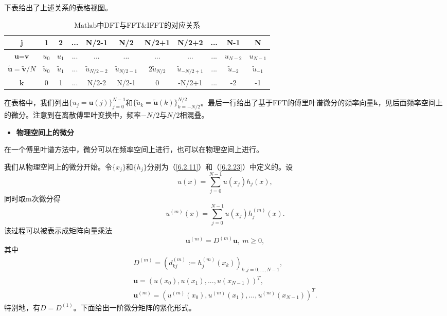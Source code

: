     下表给出了上述关系的表格视图。    
\begin{table}[h]
\centering
\caption{$\mathrm{Matlab}$中DFT与FFT$\&$IFFT的对应关系}
\begin{tabular}{ccccccccccc}
\hline
 j&  1&  2&  ...&  N/2-1&  N/2&  N/2+1&  N/2+2&  ...&  N-1& N \\ \hline
 $\textbf{u} = \textbf{v}$&  $u_0$&  $u_1$&  ...&  ...&  ...&  ...& ...&  ...&  $u_{N-2}$& $u_{N-1}$ \\
 $\widetilde{\textbf{u}} = \widetilde{\textbf{v}}/N$&  $\widetilde{u}_0$&  $\widetilde{u}_1$&  ...&  $\widetilde{u}_{N/2-2}$&  $\widetilde{u}_{N/2-1}$&  $2\widetilde{u}_{N/2}$&  $\widetilde{u}_{-N/2+1}$&  ...&  $\widetilde{u}_{-2}$& $\widetilde{u}_{-1}$ \\
 $\textbf{k}$&  0&  1&  ...&  N/2-2&  N/2-1&  0&  -N/2+1&  ...&  -2& -1 \\ \hline
\end{tabular}
\label{表6.2.1}
\end{table}    
    在表格中，我们列出$\{ u_j = \textbf{u}(j) \}_{j = 0}^{N-1}$和$\{ \widetilde{u}_k = \widetilde{\textbf{u}}(k) \}_{k = -N/2}^{N/2}$。最后一行给出了基于FFT的傅里叶谱微分的频率向量$\textbf{k}$，见后面频率空间上的微分。注意到在离散傅里叶变换中，频率$-N/2$与$N/2$相混叠。
    
\begin{itemize}
    \item    \textbf{物理空间上的微分}
\end{itemize}     

    在一个傅里叶谱方法中，微分可以在频率空间上进行，也可以在物理空间上进行。
    
    我们从物理空间上的微分开始。令$\{ x_j \}$和$\{ h_j \}$分别为（\ref{6.2.11}）和（\ref{6.2.23}）中定义的。设    
\begin{equation}
    u(x) = \sum_{j = 0}^{N-1} u(x_j)h_j(x),
\label{6.2.31}
\end{equation}          
    同时取m次微分得   
\begin{equation}
    u^{(m)}(x) = \sum_{j = 0}^{N-1} u(x_j)h_j^{(m)}(x).
\label{6.2.32}
\end{equation}    
    该过程可以被表示成矩阵向量乘法    
\begin{equation}
    \textbf{u}^{(m)} = D^{(m)}\textbf{u}, \   m\geq 0,
\label{6.2.33}
\end{equation}    
    其中    
\begin{equation*}
     \begin{array}{l}
         D^{(m)} = \left(d_{kj}^{(m)} := h_j^{(m)}(x_k) \right)_{k,j = 0,...,N-1},  \\
         \textbf{u} = \left(u(x_0),u(x_1),...,u(x_{N-1})\right)^T,  \\
         \textbf{u}^{(m)} = \left( u^{(m)}(x_0),u^{(m)}(x_1),...,u^{(m)}(x_{N-1}) \right) ^T.
     \end{array}
\end{equation*}    
    特别地，有$D = D^{(1)}$。下面给出一阶微分矩阵的紧化形式。
    
